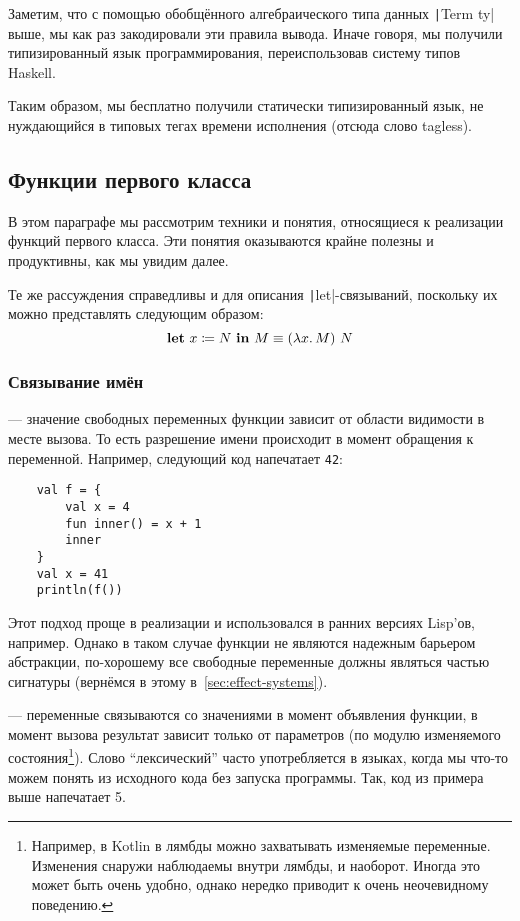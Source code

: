 Заметим, что с помощью обобщённого алгебраического типа данных \texttt|Term ty| выше, мы как раз закодировали эти правила вывода.
Иначе говоря, мы получили типизированный язык программирования, переиспользовав систему типов Haskell.

Таким образом, мы бесплатно получили статически типизированный язык, не нуждающийся в типовых тегах времени исполнения (отсюда слово tagless).

\subsection{Функции первого класса} \label{subsec:first-class-functions}

В этом параграфе мы рассмотрим техники и понятия, относящиеся к реализации функций первого класса.
Эти понятия оказываются крайне полезны и продуктивны, как мы увидим далее.

Те же рассуждения справедливы и для описания \texttt|let|-связываний, поскольку их можно представлять следующим образом:
\[
    \mathbf{let} ~ x \coloneqq N ~ \mathbf{in} ~ M \equiv (\lambda x\ldotp M) ~ N
\]

\subsubsection{Связывание имён}

 --- значение свободных переменных функции зависит от области видимости в месте вызова.
То есть разрешение имени происходит в момент обращения к переменной.
Например, следующий код напечатает \texttt{42}:
\begin{verbatim}
    val f = {
        val x = 4
        fun inner() = x + 1
        inner
    }
    val x = 41
    println(f())
\end{verbatim}

Этот подход проще в реализации и использовался в ранних версиях Lisp'ов, например.
Однако в таком случае функции не являются надежным барьером абстракции, по-хорошему все свободные переменные должны являться частью сигнатуры (вернёмся в этому в~\ref{sec:effect-systems}).

 --- переменные связываются со значениями в момент объявления функции, в момент вызова результат зависит только от параметров (по модулю изменяемого состояния\footnote{Например, в Kotlin в лямбды можно захватывать изменяемые переменные. Изменения снаружи наблюдаемы внутри лямбды, и наоборот. Иногда это может быть очень удобно, однако нередко приводит к очень неочевидному поведению.}).
Слово ``лексический'' часто употребляется в языках, когда мы что-то можем понять из исходного кода без запуска программы.
Так, код из примера выше напечатает 5.

